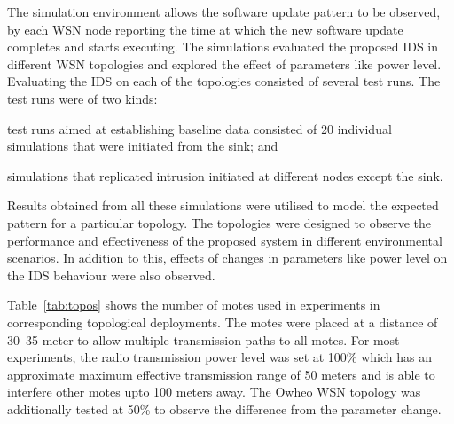 \documentclass[conference]{IEEEtran}
\newcommand{\notedme}[1]{\raisebox{0pt}[0pt][0pt]{\pdfcomment[open=true,color=blue]{#1}}}
\begin{document}

The simulation environment allows the software update pattern to be observed, by each WSN node reporting the time at which the new software update completes and starts executing.
The simulations evaluated the proposed IDS in different WSN topologies and explored the effect of parameters like power level.
Evaluating the IDS on each of the topologies consisted of several test runs.
The test runs were of two kinds: 
\begin{inparaenum}
\item test runs aimed at establishing baseline data consisted of 20 individual simulations that were initiated from the sink; and
\item simulations that replicated intrusion initiated at different nodes except the sink.
\end{inparaenum}
Results obtained from all these simulations were utilised to model the expected pattern for a particular topology.
%
The topologies were designed to observe the performance and effectiveness %
of the proposed system in different environmental scenarios. 
In addition to this, effects of changes in parameters like power level on the IDS behaviour were also observed.


Table~\ref{tab:topos} shows the number of motes used in experiments in corresponding topological  deployments.
The motes were placed at a distance of 30--35 meter to allow  multiple transmission paths to all motes. %
For most experiments, the radio transmission power level was set at 100\% which has an approximate maximum effective transmission range of 50 meters and is able to interfere other motes upto 100 meters away.
The Owheo WSN topology was additionally tested at 50\%  to %
observe the difference from the parameter change.
\end{document}
